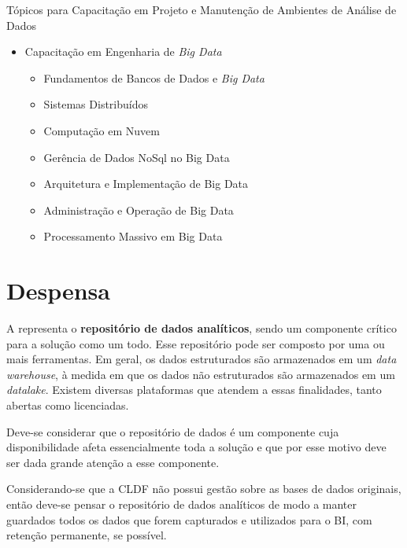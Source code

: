 \begin{env-destaque}{Tópicos para Capacitação em Projeto e Manutenção de Ambientes de Análise de Dados}
\begin{itemize}
            \item Capacitação em Engenharia de \emph{Big Data}
                \begin{itemize}
                    \item Fundamentos de Bancos de Dados e \emph{Big Data}
                    \item Sistemas Distribuídos        
                    \item Computação em Nuvem
                    \item Gerência de Dados NoSql no Big Data
                    \item Arquitetura e Implementação de Big Data
                    \item Administração e Operação de Big Data
                    \item Processamento Massivo em Big Data
                \end{itemize}
        \end{itemize}
    \end{env-destaque}

    \section{Despensa}
    
    \begin{env-cenario2}{}
            \mschecknao \xspace \DESPENSA
    \end{env-cenario2}    
    
    A  representa o \textbf{repositório de dados analíticos}, sendo um componente crítico para a solução como um todo. Esse repositório pode ser composto por uma ou mais ferramentas. Em geral, os dados estruturados são armazenados em um \emph{data warehouse}, à medida em que os dados não estruturados são armazenados em um \emph{datalake}. Existem diversas plataformas que atendem a essas finalidades, tanto abertas como licenciadas.
    
    Deve-se considerar que o repositório de dados é um componente cuja disponibilidade afeta essencialmente toda a solução e que por esse motivo deve ser dada grande atenção a esse componente.
    
    Considerando-se que a CLDF não possui gestão sobre as bases de dados originais, então deve-se pensar o repositório de dados analíticos de modo a manter guardados todos os dados que forem capturados e utilizados para o BI, com retenção permanente, se possível.
    
